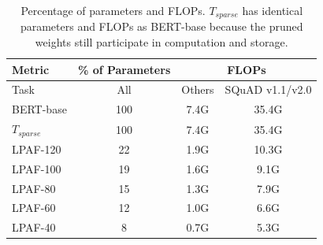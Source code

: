 \begin{table}[th]
	\scriptsize
	\centering
	\begin{tabular}{|l|cl|cc|}
\hline
		Metric       & \multicolumn{2}{c|}{\% of Parameters} & \multicolumn{2}{c|}{FLOPs} \\ 
\hline
		Task         & \multicolumn{2}{c|}{All}          & Others    & SQuAD v1.1/v2.0    \\ 
\hline
		BERT-base    & \multicolumn{2}{c|}{100}          & 7.4G      & 35.4G         \\
		$T_{sparse}$ & \multicolumn{2}{c|}{100}          & 7.4G      & 35.4G         \\ 
\hline
		LPAF-120     & \multicolumn{2}{c|}{22}           & 1.9G      & 10.3G         \\
		LPAF-100     & \multicolumn{2}{c|}{19}           & 1.6G      & 9.1G          \\
		LPAF-80      & \multicolumn{2}{c|}{15}           & 1.3G      & 7.9G          \\
		LPAF-60      & \multicolumn{2}{c|}{12}           & 1.0G      & 6.6G          \\
		LPAF-40      & \multicolumn{2}{c|}{8}            & 0.7G      & 5.3G          \\ 
\hline
	\end{tabular}
	\caption{Percentage of parameters and FLOPs. $T_{sparse}$ has identical parameters and FLOPs as BERT-base because the pruned weights still participate in computation and storage.}
	\label{table:stats}
\end{table}
